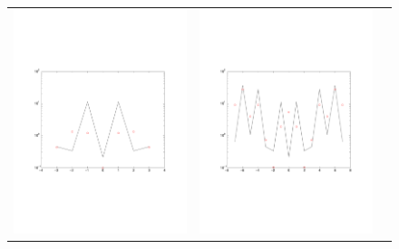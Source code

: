 \begin{figure}[htpb]
  \centering
  \begin{tabular}{ccc}
  \includegraphics[scale=0.25]{figs/tracAliasingUp1N08} &
  \includegraphics[scale=0.25]{figs/tracAliasingUp1N16} &

\end{tabular}
\end{figure}
